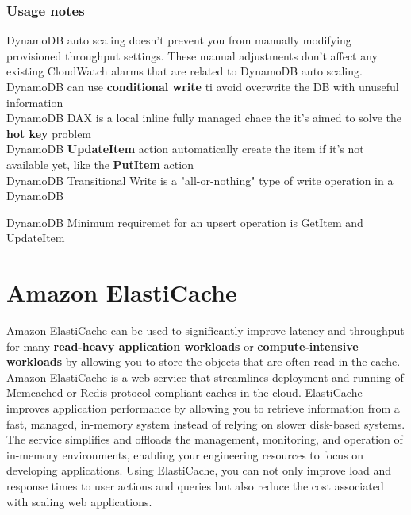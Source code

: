 \documentclass[12pt, letterpaper, twoside]{article}
\begin{document}
\subsubsection{Usage notes}
DynamoDB auto scaling doesn't prevent you from manually modifying provisioned throughput settings. These manual adjustments 
don't affect any existing CloudWatch alarms that are related to DynamoDB auto scaling.\\

DynamoDB can use \textbf{conditional write} ti avoid overwrite the DB with unuseful information\\

DynamoDB DAX is a local inline fully managed chace the it's aimed to solve the \textbf{hot key} problem\\

DynamoDB \textbf{UpdateItem} action automatically create the item if it's not 
available yet, like the \textbf{PutItem} action\\

DynamoDB Transitional Write is a "all-or-nothing" type of write operation in a DynamoDB 

DynamoDB Minimum requiremet for an upsert operation is GetItem and UpdateItem

\section{Amazon ElastiCache}
Amazon ElastiCache can be used to significantly improve latency and throughput for many \textbf{read-heavy application workloads} or 
\textbf{compute-intensive workloads} by allowing you to store the objects that are often read in the cache.\\

Amazon ElastiCache is a web service that streamlines deployment and running of Memcached or Redis protocol-compliant 
caches in the cloud. ElastiCache improves application performance by allowing you to retrieve information from a fast, 
managed, in-memory system instead of relying on slower disk-based systems.\\
The service simplifies and offloads the management, monitoring, and operation of in-memory environments, enabling your 
engineering resources to focus on developing applications. Using ElastiCache, you can not only improve load and response 
times to user actions and queries but also reduce the cost associated with scaling web applications.\\
\end{document}
